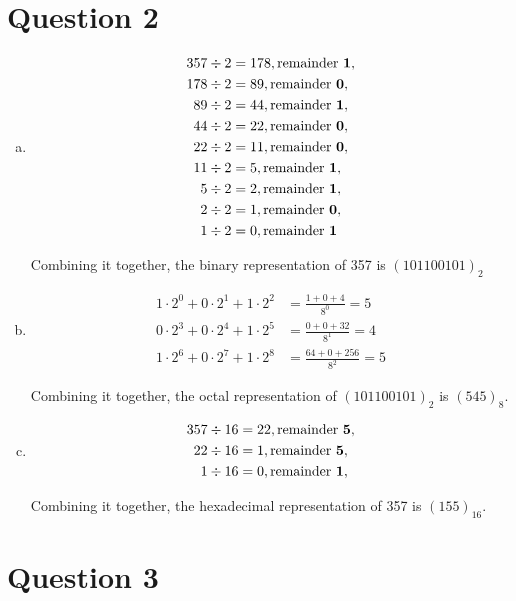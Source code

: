 \documentclass[12pt]{article}
\begin{document}
\section*{Question 2}
\begin{enumerate}[a.]
    \item
    \setcounter{equation}{0}
    \begin{align*}
        357 \div 2 &= 178, \text{remainder \textbf{1}},\\
        178 \div 2 &= 89, \text{remainder \textbf{0}},\\
        89 \div 2 &= 44, \text{remainder \textbf{1}},\\
        44 \div 2 &= 22, \text{remainder \textbf{0}},\\
        22 \div 2 &= 11, \text{remainder \textbf{0}},\\
        11 \div 2 &= 5, \text{remainder \textbf{1}},\\
        5 \div 2 &= 2, \text{remainder \textbf{1}},\\
        2 \div 2 &= 1, \text{remainder \textbf{0}},\\
        1 \div 2 &= 0, \text{remainder \textbf{1}}
    \end{align*}

    Combining it together, the binary representation of 357 is $(101100101)_2$

    \item

    \begin{align*}
        1 \cdot 2^0 + 0 \cdot 2^1 + 1 \cdot 2^2 &= \frac{1 + 0 + 4}{8^0} = 5\\
        0 \cdot 2^3 + 0 \cdot 2^4 + 1 \cdot 2^5 &= \frac{0 + 0 + 32}{8^1} = 4\\
        1 \cdot 2^6 + 0 \cdot 2^7 + 1 \cdot 2^8 &= \frac{64 + 0 + 256}{8^2} = 5
    \end{align*}

    Combining it together, the octal representation of $(101100101)_2$ is
    $(545)_8$.

    \item

    \begin{align*}
        357 \div 16 &= 22, \text{remainder \textbf{5}},\\
        22 \div 16 &= 1, \text{remainder \textbf{5}},\\
        1 \div 16 &= 0, \text{remainder \textbf{1}},\\
    \end{align*}

    Combining it together, the hexadecimal representation of 357 is $(155)_{16}$.

\end{enumerate}

\section*{Question 3}
\end{document}

